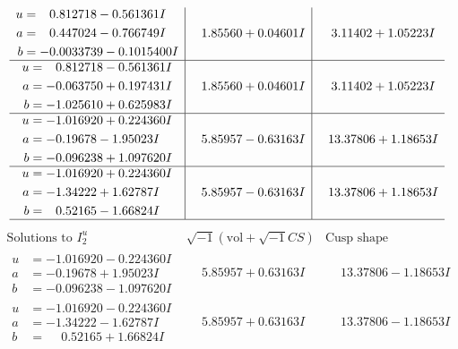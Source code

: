 \documentclass[1p]{elsarticle_modified}
\theoremstyle{definition}
\newcommand{\I}{\sqrt{-1}}
\begin{document}
$$\begin{array}{c|c|c}
\begin{aligned}
u &= \phantom{-}0.812718 - 0.561361 I \\
a &= \phantom{-}0.447024 - 0.766749 I \\
b &= -0.0033739 - 0.1015400 I\end{aligned}
 & \phantom{-}1.85560 + 0.04601 I & \phantom{-}3.11402 + 1.05223 I \\ \hline\begin{aligned}
u &= \phantom{-}0.812718 - 0.561361 I \\
a &= -0.063750 + 0.197431 I \\
b &= -1.025610 + 0.625983 I\end{aligned}
 & \phantom{-}1.85560 + 0.04601 I & \phantom{-}3.11402 + 1.05223 I \\ \hline\begin{aligned}
u &= -1.016920 + 0.224360 I \\
a &= -0.19678 - 1.95023 I \\
b &= -0.096238 + 1.097620 I\end{aligned}
 & \phantom{-}5.85957 - 0.63163 I & \phantom{-}13.37806 + 1.18653 I \\ \hline\begin{aligned}
u &= -1.016920 + 0.224360 I \\
a &= -1.34222 + 1.62787 I \\
b &= \phantom{-}0.52165 - 1.66824 I\end{aligned}
 & \phantom{-}5.85957 - 0.63163 I & \phantom{-}13.37806 + 1.18653 I\\
 \hline 
 \end{array}$$\newpage$$\begin{array}{c|c|c}  
\text{Solutions to }I^u_{2}& \I (\text{vol} + \sqrt{-1}CS) & \text{Cusp shape}\\
 \hline 
\begin{aligned}
u &= -1.016920 - 0.224360 I \\
a &= -0.19678 + 1.95023 I \\
b &= -0.096238 - 1.097620 I\end{aligned}
 & \phantom{-}5.85957 + 0.63163 I & \phantom{-}13.37806 - 1.18653 I \\ \hline\begin{aligned}
u &= -1.016920 - 0.224360 I \\
a &= -1.34222 - 1.62787 I \\
b &= \phantom{-}0.52165 + 1.66824 I\end{aligned}
 & \phantom{-}5.85957 + 0.63163 I & \phantom{-}13.37806 - 1.18653 I \\ \hline\begin{aligned}

\end{aligned}
\end{array}$$
\end{document}
